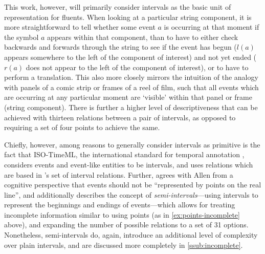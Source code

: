 \documentclass[a4paper,12pt,leqno]{article}
\begin{document}
This work, however, will primarily consider intervals as the basic unit of representation for fluents. When looking at a particular string component, it is more straightforward to tell whether some event $a$ is occurring at that moment if the symbol $a$ appears within that component, than to have to either check backwards and forwards through the string to see if the event has begun ($l(a)$ appears somewhere to the left of the component of interest) and not yet ended ($r(a)$ does not appear to the left of the component of interest), or to have to perform a translation. This also more closely mirrors the intuition of the analogy with panels of a comic strip or frames of a reel of film, such that all events which are occurring at any particular moment are `visible' within that panel or frame (string component). There is further a higher level of descriptiveness that can be achieved with thirteen relations between a pair of intervals, as opposed to requiring a set of four points to achieve the same.%

Chiefly, however, among reasons to generally consider intervals as primitive is the fact that ISO-TimeML, the international standard for temporal annotation \cite{pustejovsky2010iso}, considers events and event-like entities to be intervals, and uses relations which are based in \citet{allen1983maintaining}'s set of interval relations. Further, \citet[p. 201]{Freksa1992} agrees with Allen from a cognitive perspective that events should not be ``represented by points on the real line'', and additionally describes the concept of \textit{semi-intervals}---using intervals to represent the beginnings and endings of events---which allows for treating incomplete information similar to using points (as in \cref{ex:points-incomplete} above), and expanding the number of possible relations to a set of 31 options. Nonetheless, semi-intervals do, again, introduce an additional level of complexity over plain intervals, and are discussed more completely in \cref{ssub:incomplete}.

\end{document}

